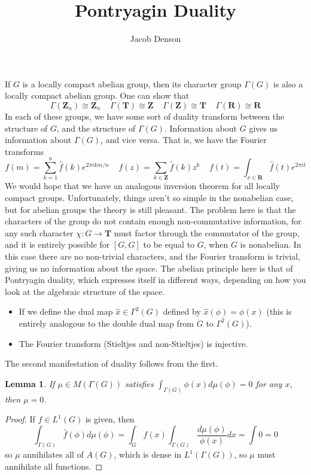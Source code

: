 \documentclass{article}
\title{Pontryagin Duality}
\author{Jacob Denson}
\theoremstyle{plain}
\newtheorem{lemma}[theorem]{Lemma}
\theoremstyle{definition}
\begin{document}
\maketitle

If $G$ is a locally compact abelian group, then its character group $\Gamma(G)$ is also a locally compact abelian group. One can show that
%
\[ \Gamma(\mathbf{Z}_n) \cong \mathbf{Z}_n\ \ \ \ \ \Gamma(\mathbf{T}) \cong \mathbf{Z}\ \ \ \ \ \Gamma(\mathbf{Z}) \cong \mathbf{T}\ \ \ \ \ \Gamma(\mathbf{R}) \cong \mathbf{R} \]
%
In each of these groups, we have some sort of duality transform between the structure of $G$, and the structure of $\Gamma(G)$. Information about $G$ gives us information about $\Gamma(G)$, and vice versa.  That is, we have the Fourier transforms
%
\[ f(m) = \sum_{k = 1}^n \widehat{f}(k) e^{2 \pi i k m/n}\ \ \ \ \ f(z) = \sum_{k \in \mathbf{Z}} \widehat{f}(k) z^k\ \ \ \ \ f(t) = \int_{x \in \mathbf{R}} \widehat{f}(t) e^{2 \pi i t} \]
%
We would hope that we have an analogous inversion theorem for all locally compact groups. Unfortunately, things aren't so simple in the nonabelian case, but for abelian groups the theory is still pleasant. The problem here is that the characters of the group do not contain enough non-commutative information, for any such character $\chi: G \to \mathbf{T}$ must factor through the commutator of the group, and it is entirely possible for $[G,G]$ to be equal to $G$, when $G$ is nonabelian. In this case there are no non-trivial characters, and the Fourier transform is trivial, giving us no information about the space. The abelian principle here is that of Pontryagin duality, which expresses itself in different ways, depending on how you look at the algebraic structure of the space.
%
\begin{itemize}
    \item If we define the dual map $\widehat{x} \in \Gamma^2(G)$ defined by $\widehat{x}(\phi) = \phi(x)$ (this is entirely analogous to the double dual map from $G$ to $\Gamma^2(G)$).
    \item The Fourier transform (Stieltjes and non-Stieltjes) is injective.
\end{itemize}

The second manifestation of duality follows from the first.

\begin{lemma}
    If $\mu \in M(\Gamma(G))$ satisfies $\int_{\Gamma(G)} \phi(x) d\mu(\phi) = 0$ for any $x$, then $\mu = 0$.
\end{lemma}
\begin{proof}
    If $f \in L^1(G)$ is given, then
    \[ \int_{\Gamma(G)} \widehat{f}(\phi) d\mu(\phi) = \int_G f(x) \int_{\Gamma(G)} \frac{d\mu(\phi)}{\phi(x)} dx = \int 0 = 0 \]
    so $\mu$ annihilates all of $A(G)$, which is dense in $L^1(\Gamma(G))$, so $\mu$ must annihilate all functions.
\end{proof}
\end{document}
